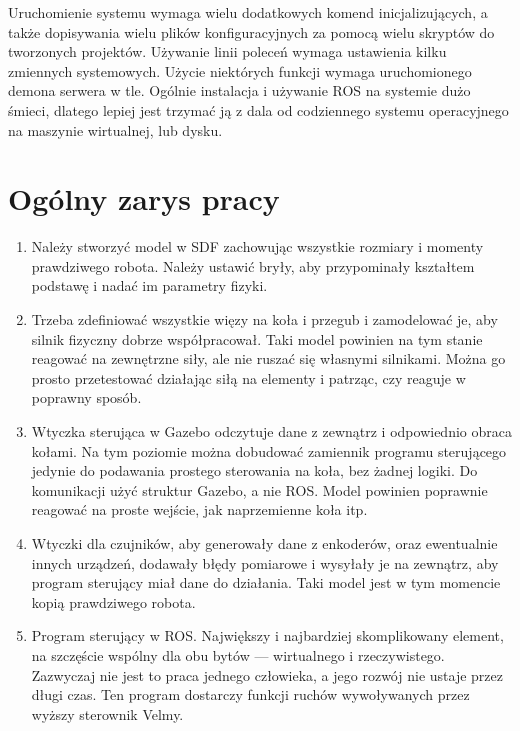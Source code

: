 Uruchomienie systemu wymaga wielu dodatkowych komend inicjalizujących, a także dopisywania wielu plików konfiguracyjnych za pomocą wielu skryptów do tworzonych projektów.
Używanie linii poleceń wymaga ustawienia kilku zmiennych systemowych.
Użycie niektórych funkcji wymaga uruchomionego demona serwera w tle.
Ogólnie instalacja i używanie ROS na systemie dużo śmieci, dlatego lepiej jest trzymać ją z dala od codziennego systemu operacyjnego na maszynie wirtualnej, lub dysku.

\section{Ogólny zarys pracy}
\begin{enumerate}
 \item Należy stworzyć model w SDF zachowując wszystkie rozmiary i momenty prawdziwego robota.
Należy ustawić bryły, aby przypominały kształtem podstawę i nadać im parametry fizyki.

\item Trzeba zdefiniować wszystkie więzy na koła i przegub i zamodelować je, aby silnik fizyczny dobrze współpracował.
Taki model powinien na tym stanie reagować na zewnętrzne siły, ale nie ruszać się własnymi silnikami.
Można go prosto przetestować działając siłą na elementy i patrząc, czy reaguje w poprawny sposób.

\item Wtyczka sterująca w Gazebo odczytuje dane z zewnątrz i odpowiednio obraca kołami.
Na tym poziomie można dobudować zamiennik programu sterującego jedynie do podawania prostego sterowania na koła, bez żadnej logiki.
Do komunikacji użyć struktur Gazebo, a nie ROS.
Model powinien poprawnie reagować na proste wejście, jak naprzemienne koła itp.

\item Wtyczki dla czujników, aby generowały dane z enkoderów, oraz ewentualnie innych urządzeń, dodawały błędy pomiarowe i wysyłały je na zewnątrz, aby program sterujący miał dane do działania.
Taki model jest w tym momencie kopią prawdziwego robota.

\item Program sterujący w ROS. Największy i najbardziej skomplikowany element, na szczęście wspólny dla obu bytów --- wirtualnego i rzeczywistego.
Zazwyczaj nie jest to praca jednego człowieka, a jego rozwój nie ustaje przez długi czas.
Ten program dostarczy funkcji ruchów wywoływanych przez wyższy sterownik Velmy.

\end{enumerate}

